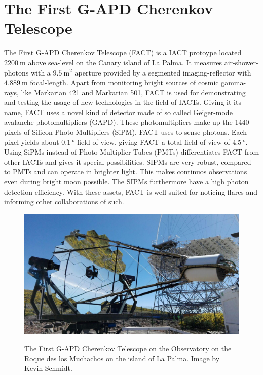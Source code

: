 \chapter{The First G-APD Cherenkov Telescope}

The First G-APD Cherenkov Telescope \cite{FACT-Design} (FACT) is a IACT protoype located $\SI{2200}{\metre}$ above sea-level on the Canary island of La Palma.
It measures air-shower-photons with a $\SI{9.5}{\meter\squared}$ aperture provided by a segmented imaging-reflector with $\SI{4.889}{\meter}$ focal-length.
Apart from monitoring bright sources of cosmic gamma-rays, like Markarian 421 and Markarian 501, FACT is used for demonstrating and testing the usage of new technologies in the field of IACTs. Giving it its name, FACT uses a novel kind of detector made of so called Geiger-mode avalanche photomultipliers (GAPD). These photomultipliers make up the 1440 pixels of Silicon-Photo-Multipliers (SiPM), FACT uses to sense photons. Each pixel yields about $\SI{0.1}{\degree}$ field-of-view, giving FACT a total field-of-view of $\SI{4.5}{\degree}$. Using SiPMs instead of Photo-Multiplier-Tubes (PMTs) differentiates FACT from other IACTs and gives it special possibilities. SIPMs are very robust, compared to PMTs and can operate in brighter light. This makes continuos observations even during bright moon possible. The SIPMs furthermore have a high photon detection efficiency. With these assets, FACT is well suited for noticing flares and informing other collaborations of such.
%
\begin{figure}
  \centering
  \includegraphics[width=\textwidth]{Plots/fact.jpg}
  \label{fig:fact}
  \caption{The First G-APD Cherenkov Telescope on the Observatory on the Roque des los Muchachos on the island of La Palma. Image by Kevin Schmidt.}
\end{figure}
%
